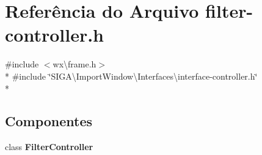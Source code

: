 \section{Referência do Arquivo filter-\/controller.h}
\label{filter-controller_8h}
{\ttfamily \#include $<$wx\textbackslash{}frame.\+h$>$}\\*
{\ttfamily \#include \char`\"{}S\+I\+G\+A\textbackslash{}\+Import\+Window\textbackslash{}\+Interfaces\textbackslash{}interface-\/controller.\+h\char`\"{}}\\*
\subsection*{Componentes}
\begin{DoxyCompactItemize}
\item 
class {\bf Filter\+Controller}
\end{DoxyCompactItemize}
